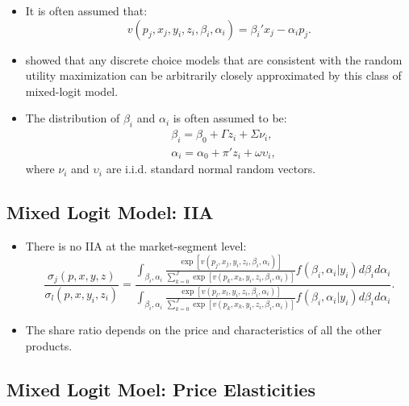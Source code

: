 \documentclass[
]{book}
\providecommand{\tightlist}{%
  \setlength{\itemsep}{0pt}\setlength{\parskip}{0pt}}
\begin{document}
\begin{itemize}
\tightlist
\item
  It is often assumed that:
  \begin{equation}
  v(p_j, x_j, y_i, z_i, \beta_i, \alpha_i) = \beta_i' x_j - \alpha_i p_j.
  \end{equation}
\item
  \citet{Mcfadden2000} showed that any discrete choice models that are consistent with the random utility maximization can be arbitrarily closely approximated by this class of mixed-logit model.
\item
  The distribution of \(\beta_i\) and \(\alpha_i\) is often assumed to be:
  \begin{equation}
  \begin{split}
  &\beta_i = \beta_0 + \Gamma z_i + \Sigma \nu_i,\\
  &\alpha_i = \alpha_0 + \pi' z_i + \omega \upsilon_i,
  \end{split}
  \end{equation}
  where \(\nu_i\) and \(\upsilon_i\) are i.i.d. standard normal random vectors.
\end{itemize}

\hypertarget{mixed-logit-model-iia}{%
\subsection{Mixed Logit Model: IIA}\label{mixed-logit-model-iia}}

\begin{itemize}
\tightlist
\item
  There is no IIA at the market-segment level:
  \begin{equation}
  \frac{\sigma_{j}(p, x, y, z)}{\sigma_{l}(p, x, y_i, z_i)} = \frac{\int_{\beta_i, \alpha_i} \frac{\exp[v(p_j, x_j, y_i, z_i, \beta_i, \alpha_i)]}{\sum_{k = 0}^J \exp[v(p_k, x_k, y_i, z_i, \beta_i, \alpha_i)]} f(\beta_i, \alpha_i|y_i) d\beta_i d\alpha_i}{\int_{\beta_i, \alpha_i} \frac{\exp[v(p_l, x_l, y_i, z_i, \beta_i, \alpha_i)]}{\sum_{k = 0}^J \exp[v(p_k, x_k, y_i, z_i, \beta_i, \alpha_i)]} f(\beta_i, \alpha_i|y_i) d\beta_i d\alpha_i}.
  \end{equation}
\item
  The share ratio depends on the price and characteristics of all the other products.
\end{itemize}

\hypertarget{mixed-logit-moel-price-elasticities}{%
\subsection{Mixed Logit Moel: Price Elasticities}\label{mixed-logit-moel-price-elasticities}}
\end{document}
